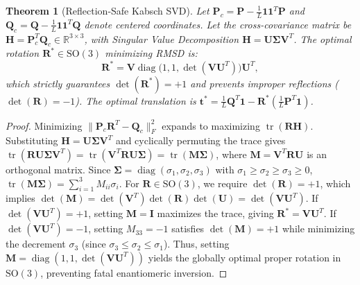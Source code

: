 \documentclass[a4paper,fleqn]{cas-dc}
\theoremstyle{thmstyleone}
\newtheorem{theorem}{Theorem}
\theoremstyle{thmstyletwo}
\theoremstyle{thmstylethree}
\begin{document}
\begin{theorem}[Reflection-Safe Kabsch SVD]
\label{thm:kabsch}
Let $\mathbf{P}_c = \mathbf{P} - \frac{1}{L}\mathbf{1}\mathbf{1}^T\mathbf{P}$ and $\mathbf{Q}_c = \mathbf{Q} - \frac{1}{L}\mathbf{1}\mathbf{1}^T\mathbf{Q}$ denote centered coordinates. Let the cross-covariance matrix be $\mathbf{H} = \mathbf{P}_c^T \mathbf{Q}_c \in \mathbb{R}^{3 \times 3}$, with Singular Value Decomposition $\mathbf{H} = \mathbf{U} \mathbf{\Sigma} \mathbf{V}^T$. The optimal rotation $\mathbf{R}^* \in \mathrm{SO}(3)$ minimizing RMSD is:
\begin{equation}
\mathbf{R}^* = \mathbf{V} \operatorname{diag}\big(1, 1, \det(\mathbf{V}\mathbf{U}^T)\big) \mathbf{U}^T,
\label{eq:kabsch_svd}
\end{equation}
which strictly guarantees $\det(\mathbf{R}^*) = +1$ and prevents improper reflections ($\det(\mathbf{R}) = -1$). The optimal translation is $\mathbf{t}^* = \frac{1}{L}\mathbf{Q}^T\mathbf{1} - \mathbf{R}^*\left(\frac{1}{L}\mathbf{P}^T\mathbf{1}\right)$.
\end{theorem}
\begin{proof}
Minimizing $\|\mathbf{P}_c \mathbf{R}^T - \mathbf{Q}_c\|_F^2$ expands to maximizing $\operatorname{tr}(\mathbf{R} \mathbf{H})$. Substituting $\mathbf{H} = \mathbf{U} \mathbf{\Sigma} \mathbf{V}^T$ and cyclically permuting the trace gives $\operatorname{tr}(\mathbf{R} \mathbf{U} \mathbf{\Sigma} \mathbf{V}^T) = \operatorname{tr}(\mathbf{V}^T \mathbf{R} \mathbf{U} \mathbf{\Sigma}) = \operatorname{tr}(\mathbf{M} \mathbf{\Sigma})$, where $\mathbf{M} = \mathbf{V}^T \mathbf{R} \mathbf{U}$ is an orthogonal matrix. Since $\mathbf{\Sigma} = \operatorname{diag}(\sigma_1, \sigma_2, \sigma_3)$ with $\sigma_1 \ge \sigma_2 \ge \sigma_3 \ge 0$, $\operatorname{tr}(\mathbf{M} \mathbf{\Sigma}) = \sum_{i=1}^3 M_{ii} \sigma_i$. For $\mathbf{R} \in \mathrm{SO}(3)$, we require $\det(\mathbf{R}) = +1$, which implies $\det(\mathbf{M}) = \det(\mathbf{V}^T) \det(\mathbf{R}) \det(\mathbf{U}) = \det(\mathbf{V}\mathbf{U}^T)$. If $\det(\mathbf{V}\mathbf{U}^T) = +1$, setting $\mathbf{M} = \mathbf{I}$ maximizes the trace, giving $\mathbf{R}^* = \mathbf{V}\mathbf{U}^T$. If $\det(\mathbf{V}\mathbf{U}^T) = -1$, setting $M_{33} = -1$ satisfies $\det(\mathbf{M}) = +1$ while minimizing the decrement $\sigma_3$ (since $\sigma_3 \le \sigma_2 \le \sigma_1$). Thus, setting $\mathbf{M} = \operatorname{diag}(1, 1, \det(\mathbf{V}\mathbf{U}^T))$ yields the globally optimal proper rotation in $\mathrm{SO}(3)$, preventing fatal enantiomeric inversion.
\end{proof}
\end{document}
